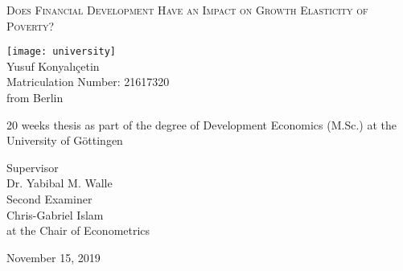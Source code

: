 \documentclass[12pt, a4paper]{article}
\date{}
\begin{document}
\begin{titlepage}
	\begin{center}
		
		\vspace*{0.5cm}
		
		\Large
		\textsc{
		Does Financial Development Have an Impact on Growth Elasticity of Poverty?}
		
		
		\vspace{1.0cm}

		\texttt{[image: university]}\\
		\vspace*{1.0cm}
		\large{
		Yusuf Konyal{\i}\c{c}etin}\\
		\vspace*{0.1cm}
		\normalsize{Matriculation Number: 21617320\\
		from Berlin\\}
		
		\vspace*{0.9cm}
		\normalsize
		20 weeks thesis as part of the degree of Development Economics (M.Sc.) at the University of Göttingen\\
		
		\vspace*{0.9cm}
		
		\normalsize{Supervisor \\ Dr. Yabibal M. Walle\\
		
		\vspace*{0.3cm}
			Second Examiner\\ Chris-Gabriel Islam \\
		
		\vspace*{0.5cm}at the Chair of Econometrics}
		
		\vspace{0.8cm}
		
		\normalsize{November 15, 2019}
		


		
	\end{center}
\end{titlepage}


\newpage
\end{document}
